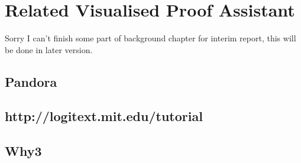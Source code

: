 \documentclass[master.tex]{subfiles}
\begin{document}
\section{Related Visualised Proof Assistant}
Sorry I can't finish some part of background chapter for interim report, this will be done in later version.

\subsection{Pandora}
\subsection{http://logitext.mit.edu/tutorial}
\subsection{Why3}
\end{document}
